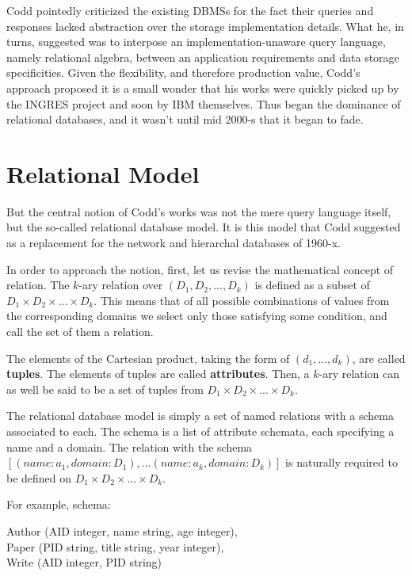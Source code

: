 \documentclass[12pt]{article}
\begin{document}
Codd pointedly criticized the existing DBMSs for the fact their queries and responses
lacked abstraction over the storage implementation details. What he, in turns, suggested
was to interpose an implementation-unaware query language, namely relational algebra,
between an application requirements and data storage specificities.
Given the flexibility, and therefore production value, Codd's approach proposed
it is a small wonder that his works were quickly picked up by the INGRES project
and soon by IBM themselves. Thus began the dominance of relational databases,
and it wasn't until mid 2000-s that it began to fade.

\section{Relational Model}

But the central notion of Codd's works was not the mere query language itself, but the
so-called relational database model. It is this model that Codd suggested as a replacement
for the network and hierarchal databases of 1960-x.

In order to approach the notion, first, let us revise the mathematical concept of relation.
The $k$-ary relation over $(D_1, D_2, ..., D_k)$ is defined as a subset of $D_1 \times D_2 \times ... \times D_k$.
This means that of all possible combinations of values from the corresponding domains
we select only those satisfying some condition, and call the set of them a relation.

The elements of the Cartesian product, taking the form of $(d_1,...,d_k)$, are called \textbf{tuples}.
The elements of tuples are called \textbf{attributes}.
Then, a $k$-ary relation can as well be said to be a set of tuples from $D_1 \times D_2 \times ... \times D_k$.

The relational database model is simply a set of named relations with a schema associated to each.
The schema is a list of attribute schemata, each specifying a name and a domain. The relation with the schema
$[(name : a_1,domain : D_1), ...(name : a_k,domain : D_k)]$
is naturally required to be defined on $D_1 \times D_2 \times ... \times D_k$.

For example, schema:

\begin{adjustwidth}{2cm}{}
		Author (AID integer, name string, age integer),\\
		Paper (PID string, title string, year integer),\\
		Write (AID integer, PID string)
\end{adjustwidth}
\end{document}
